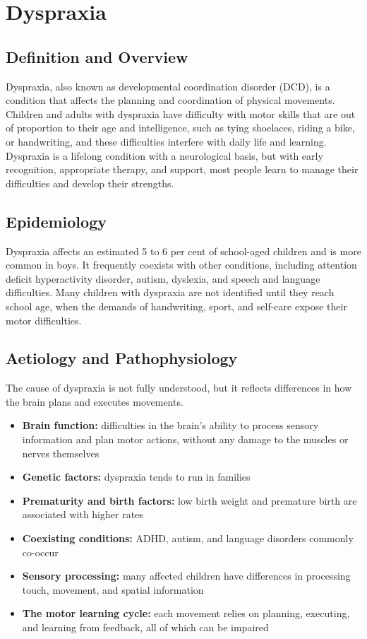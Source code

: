 \chapter{Dyspraxia}

\section*{Definition and Overview}
Dyspraxia, also known as developmental coordination disorder (DCD), is a condition that affects the planning and coordination of physical movements. Children and adults with dyspraxia have difficulty with motor skills that are out of proportion to their age and intelligence, such as tying shoelaces, riding a bike, or handwriting, and these difficulties interfere with daily life and learning. Dyspraxia is a lifelong condition with a neurological basis, but with early recognition, appropriate therapy, and support, most people learn to manage their difficulties and develop their strengths.

\section*{Epidemiology}
Dyspraxia affects an estimated 5 to 6 per cent of school-aged children and is more common in boys. It frequently coexists with other conditions, including attention deficit hyperactivity disorder, autism, dyslexia, and speech and language difficulties. Many children with dyspraxia are not identified until they reach school age, when the demands of handwriting, sport, and self-care expose their motor difficulties.

\section*{Aetiology and Pathophysiology}
The cause of dyspraxia is not fully understood, but it reflects differences in how the brain plans and executes movements.
\begin{itemize}
    \item \textbf{Brain function:} difficulties in the brain's ability to process sensory information and plan motor actions, without any damage to the muscles or nerves themselves
    \item \textbf{Genetic factors:} dyspraxia tends to run in families
    \item \textbf{Prematurity and birth factors:} low birth weight and premature birth are associated with higher rates
    \item \textbf{Coexisting conditions:} ADHD, autism, and language disorders commonly co-occur
    \item \textbf{Sensory processing:} many affected children have differences in processing touch, movement, and spatial information
    \item \textbf{The motor learning cycle:} each movement relies on planning, executing, and learning from feedback, all of which can be impaired
\end{itemize}

